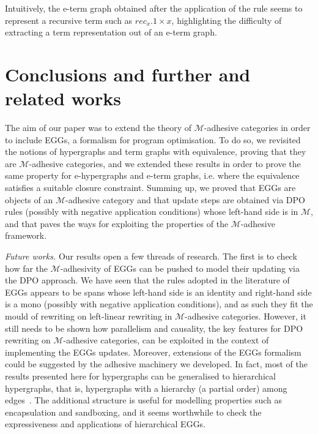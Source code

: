 \documentclass[3p]{elsarticle}
\theoremstyle{remark}
\theoremstyle{definition}
\begin{document}
%
Intuitively, the e-term graph obtained after the application of the rule seems to represent a recursive term such 
as $rec_x. 1 \times x$, highlighting the difficulty of extracting a term representation out of an e-term graph.


\section{Conclusions and further and related works}
\label{conclusioni}
The aim of our paper was to extend the theory of $\mathcal{M}$-adhesive categories in order to include EGGs, 
a formalism for program optimisation. 
%
To do so, we revisited the notions of hypergraphs and term graphs with equivalence, 
proving that they are $\mathcal{M}$-adhesive categories, and we extended these results in order to
prove the same property for e-hypergraphs and e-term graphs, i.e. where the equivalence satisfies 
a suitable closure constraint.
Summing up, we proved that EGGs are objects of an $\mathcal{M}$-adhesive category
and that update steps are obtained via DPO rules (possibly with negative application conditions) whose 
left-hand side is in $\mathcal{M}$,
and that paves the ways for exploiting the properties 
of the $\mathcal{M}$-adhesive framework.

\emph{Future works.}
Our results open a few threads of research. The first is to check how far the $\mathcal{M}$-adhesivity 
of EGGs can be pushed to model their updating via the DPO approach. We have seen that 
the rules adopted in the literature of EGGs appears to be spans whose left-hand side is an identity and 
right-hand side is a mono (possibly with negative application 
conditions), and as such they fit the mould of rewriting on left-linear rewriting in $\mathcal{M}$-adhesive categories. 
%
However, it still needs to be shown how parallelism and causality, the key features for DPO rewriting
on $\mathcal{M}$-adhesive categories, can be exploited in the context of implementing the 
EGGs updates. 
Moreover, extensions of the EGGs formalism could be suggested by the adhesive 
machinery we developed.
In fact, most of the results
presented here for hypergraphs can be generalised to hierarchical hypergraphs, that is, 
hypergraphs with a hierarchy (a partial order) among 
edges~\cite{ghicaZan,CastelnovoGM24}.
The additional structure is useful for modelling properties such as encapsulation and sandboxing,
and it seems worthwhile to check the expressiveness and applications of hierarchical EGGs.
\end{document}
